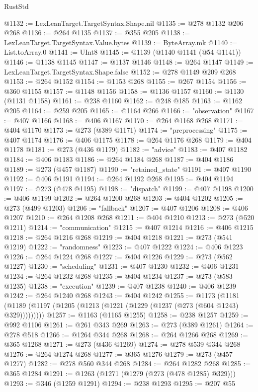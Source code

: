 \begin{lexlean}{RustStd}
\begin{coremodule}
{\begin{coremodule}
{{{{{{{{{{{{{{{{{{{{{{{{{{{{{{{{{{{{{{{{{{{{{{{{{{{{{{{{{{{{{{{{{{{{{{{{{{{{{{{{{{{{{@1132 := LexLeanTarget.TargetSyntax.Shape.nil
@1135 := @278 @1132 @206 @268
@1136 := @264 @1135
@1137 := @355 @205
@1138 := LexLeanTarget.TargetSyntax.Value.bytes
@1139 := ByteArray.mk
@1140 := List.toArray.{0}
@1141 := UInt8
@1145 := @1139 (@1140 @1141 (@54 @1141))
@1146 := @1138 @1145
@1147 := @1137 @1146
@1148 := @264 @1147
@1149 := LexLeanTarget.TargetSyntax.Shape.false
@1152 := @278 @1149 @209 @268
@1153 := @264 @1152
@1154 := @1153 @268
@1155 := @267 @1154
@1156 := @360 @1155
@1157 := @1148 @1156
@1158 := @1136 @1157
@1160 := @1130 (@1131 @1158)
@1161 := @238 @1160
@1162 := @248 @185
@1163 := @1162 @205
@1164 := @259 @205
@1165 := @1164 @266
@1166 := "observation"
@1167 := @407 @1166
@1168 := @406 @1167
@1170 := @264 @1168 @268
@1171 := @404 @1170
@1173 := @273 (@389 @1171)
@1174 := "preprocessing"
@1175 := @407 @1174
@1176 := @406 @1175
@1178 := @264 @1176 @268
@1179 := @404 @1178
@1181 := @273 (@436 @1179)
@1182 := "advice"
@1183 := @407 @1182
@1184 := @406 @1183
@1186 := @264 @1184 @268
@1187 := @404 @1186
@1189 := @273 (@457 @1187)
@1190 := "retained_state"
@1191 := @407 @1190
@1192 := @406 @1191
@1194 := @264 @1192 @268
@1195 := @404 @1194
@1197 := @273 (@478 @1195)
@1198 := "dispatch"
@1199 := @407 @1198
@1200 := @406 @1199
@1202 := @264 @1200 @268
@1203 := @404 @1202
@1205 := @273 (@499 @1203)
@1206 := "fallback"
@1207 := @407 @1206
@1208 := @406 @1207
@1210 := @264 @1208 @268
@1211 := @404 @1210
@1213 := @273 (@520 @1211)
@1214 := "communication"
@1215 := @407 @1214
@1216 := @406 @1215
@1218 := @264 @1216 @268
@1219 := @404 @1218
@1221 := @273 (@541 @1219)
@1222 := "randomness"
@1223 := @407 @1222
@1224 := @406 @1223
@1226 := @264 @1224 @268
@1227 := @404 @1226
@1229 := @273 (@562 @1227)
@1230 := "scheduling"
@1231 := @407 @1230
@1232 := @406 @1231
@1234 := @264 @1232 @268
@1235 := @404 @1234
@1237 := @273 (@583 @1235)
@1238 := "execution"
@1239 := @407 @1238
@1240 := @406 @1239
@1242 := @264 @1240 @268
@1243 := @404 @1242
@1255 := @1173
    (@1181 (@1189 (@1197 (@1205 (@1213 (@1221 (@1229 (@1237 (@273 (@604 @1243) @329)))))))))
@1257 := @1163 (@1165 @1255)
@1258 := @238 @1257
@1259 := @992 @1106
@1261 := @261 @343 @269
@1263 := @273 (@389 @1261)
@1264 := @278 @518
@1266 := @1264 @344 @268
@1268 := @264 @1266 @268
@1269 := @365 @1268
@1271 := @273 (@436 @1269)
@1274 := @278 @539 @344 @268
@1276 := @264 @1274 @268
@1277 := @365 @1276
@1279 := @273 (@457 @1277)
@1282 := @278 @560 @344 @268
@1284 := @264 @1282 @268
@1285 := @365 @1284
@1291 := @1263 (@1271 (@1279 (@273 (@478 @1285) @329)))
@1293 := @346 (@1259 @1291)
@1294 := @238 @1293
@1295 := @207 @55
}}}}}}}}}}}}}}}}}}}}}}}}}}}}}}}}}}}}}}}}}}}}}}}}}}}}}}}}}}}}}}}}}}}}}}}}}}}}}}}}}}}}}
\end{coremodule}}
\end{coremodule}
\end{lexlean}

